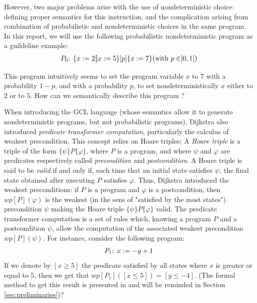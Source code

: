 \documentclass[a4paper,10pt]{llncs}
\begin{document}
However, two major problems arise with the use of nondeterministic choice: defining proper semantics for this instruction, and the complication arising from combination of probabilistic and nondeterministic choices in the same program. In this report, we will use the following probabilistic nondeterministic program as a guildeline example:
\begin{align*}
 P_0\textnormal{: } \{ x := 2 [\!] x := 5 \} [p] \{ x := 7 \} \textnormal{(with } p \in ]0,1[\textnormal{)}
\end{align*}

This program intuitively seems to set the program variable $x$ to $7$ with a probability $1-p$, and with a probability $p$, to set nondeterministically $x$ either to $2$ or to $5$. How can we semantically describe this program ?\bigskip

When introducing the GCL language \cite{Dijkstra76} (whose semantics allow it to generate nondeterministic programs, but not probabilistic programs), Dijkstra also introduced \emph{predicate transformer computation}, particularly the calculus of weakest precondition. This concept relies on Hoare triples: A \emph{Hoare triple} is a triple of the form $\{\psi\}P\{\varphi\}$, where $P$ is a program, and where $\psi$ and $\varphi$ are predicates respectively called \emph{precondition} and \emph{postcondition}. A Hoare triple is said to be \emph{valid} if and only if, each time that an initial state satisfies $\psi$, the final state obtained after executing $P$ satisfies $\varphi$. Thus, Dijkstra introduced the weakest preconditions: if $P$ is a program and $\varphi$ is a postcondition, then $wp[P](\varphi)$ is the weakest (in the sens of "satisfied by the most states") precondition $\psi$ making the Hoare triple $\{\psi\}P\{\varphi\}$ valid.  The predicate transformer computation is a set of rules which, knowing a program $P$ and a postcondition $\psi$, allow the computation of the associated weakest precondition $wp[P](\psi)$.\newline
For instance, consider the following program:
\begin{align*}
 P_1\textnormal{: } x := -y+1
\end{align*}
If we denote by $[x \geq 5]$ the predicate satisfied by all states where $x$ is greater or equal to $5$, then we get that $wp[P_1]([x \leq 5]) = [y \leq -4]$. (The formal method to get this result is presented in \cite{Dijkstra76} and will be reminded in Section \ref{sec:preliminaries})?\bigskip
\end{document}
